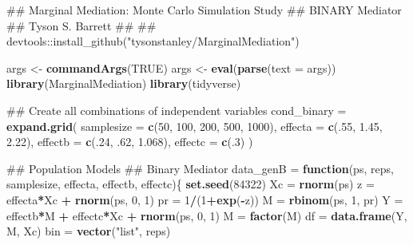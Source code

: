 \documentclass[]{DissertateUSU}
\newenvironment{Shaded}{\begin{snugshade}}{\end{snugshade}}
\newcommand{\KeywordTok}[1]{\textcolor[rgb]{0.13,0.29,0.53}{\textbf{#1}}}
\newcommand{\DataTypeTok}[1]{\textcolor[rgb]{0.13,0.29,0.53}{#1}}
\newcommand{\DecValTok}[1]{\textcolor[rgb]{0.00,0.00,0.81}{#1}}
\newcommand{\FloatTok}[1]{\textcolor[rgb]{0.00,0.00,0.81}{#1}}
\newcommand{\StringTok}[1]{\textcolor[rgb]{0.31,0.60,0.02}{#1}}
\newcommand{\OtherTok}[1]{\textcolor[rgb]{0.56,0.35,0.01}{#1}}
\newcommand{\ControlFlowTok}[1]{\textcolor[rgb]{0.13,0.29,0.53}{\textbf{#1}}}
\newcommand{\OperatorTok}[1]{\textcolor[rgb]{0.81,0.36,0.00}{\textbf{#1}}}
\newcommand{\NormalTok}[1]{#1}
\begin{document}
\begin{Shaded}
\begin{Highlighting}[]
\NormalTok{## Marginal Mediation: Monte Carlo Simulation Study}
\NormalTok{##   BINARY Mediator}
\NormalTok{## Tyson S. Barrett}
\NormalTok{##}
\NormalTok{## devtools::install_github("tysonstanley/MarginalMediation")}

\NormalTok{args <-}\StringTok{ }\KeywordTok{commandArgs}\NormalTok{(}\OtherTok{TRUE}\NormalTok{)}
\NormalTok{args <-}\StringTok{ }\KeywordTok{eval}\NormalTok{(}\KeywordTok{parse}\NormalTok{(}\DataTypeTok{text =}\NormalTok{ args))}
\KeywordTok{library}\NormalTok{(MarginalMediation)}
\KeywordTok{library}\NormalTok{(tidyverse)}

\NormalTok{## Create all combinations of independent variables}
\NormalTok{cond_binary =}\StringTok{ }\KeywordTok{expand.grid}\NormalTok{(}
  \DataTypeTok{samplesize =} \KeywordTok{c}\NormalTok{(}\DecValTok{50}\NormalTok{, }\DecValTok{100}\NormalTok{, }\DecValTok{200}\NormalTok{, }\DecValTok{500}\NormalTok{, }\DecValTok{1000}\NormalTok{),}
  \DataTypeTok{effecta    =} \KeywordTok{c}\NormalTok{(.}\DecValTok{55}\NormalTok{, }\FloatTok{1.45}\NormalTok{, }\FloatTok{2.22}\NormalTok{),}
  \DataTypeTok{effectb    =} \KeywordTok{c}\NormalTok{(.}\DecValTok{24}\NormalTok{, .}\DecValTok{62}\NormalTok{, }\FloatTok{1.068}\NormalTok{),}
  \DataTypeTok{effectc    =} \KeywordTok{c}\NormalTok{(.}\DecValTok{3}\NormalTok{)}
\NormalTok{)}

\NormalTok{## Population Models}
\NormalTok{## Binary Mediator}
\NormalTok{data_genB =}\StringTok{ }\ControlFlowTok{function}\NormalTok{(ps, reps, samplesize, effecta, effectb, effectc)\{}
  \KeywordTok{set.seed}\NormalTok{(}\DecValTok{84322}\NormalTok{)}
\NormalTok{  Xc =}\StringTok{ }\KeywordTok{rnorm}\NormalTok{(ps)}
\NormalTok{  z  =}\StringTok{ }\NormalTok{effecta}\OperatorTok{*}\NormalTok{Xc }\OperatorTok{+}\StringTok{ }\KeywordTok{rnorm}\NormalTok{(ps, }\DecValTok{0}\NormalTok{, }\DecValTok{1}\NormalTok{)}
\NormalTok{  pr =}\StringTok{ }\DecValTok{1}\OperatorTok{/}\NormalTok{(}\DecValTok{1}\OperatorTok{+}\KeywordTok{exp}\NormalTok{(}\OperatorTok{-}\NormalTok{z))}
\NormalTok{  M  =}\StringTok{ }\KeywordTok{rbinom}\NormalTok{(ps, }\DecValTok{1}\NormalTok{, pr)}
\NormalTok{  Y  =}\StringTok{ }\NormalTok{effectb}\OperatorTok{*}\NormalTok{M }\OperatorTok{+}\StringTok{ }\NormalTok{effectc}\OperatorTok{*}\NormalTok{Xc }\OperatorTok{+}\StringTok{ }\KeywordTok{rnorm}\NormalTok{(ps, }\DecValTok{0}\NormalTok{, }\DecValTok{1}\NormalTok{)}
\NormalTok{  M  =}\StringTok{ }\KeywordTok{factor}\NormalTok{(M)}
\NormalTok{  df =}\StringTok{ }\KeywordTok{data.frame}\NormalTok{(Y, M, Xc)}
\NormalTok{  bin =}\StringTok{ }\KeywordTok{vector}\NormalTok{(}\StringTok{"list"}\NormalTok{, reps)}
  

\end{Highlighting}
\end{Shaded}
\end{document}
